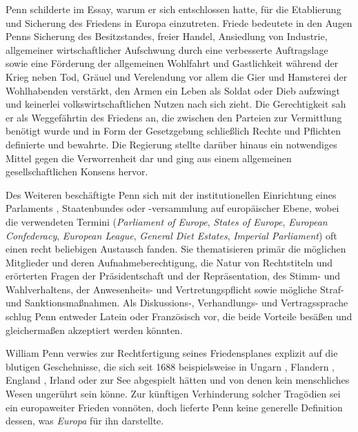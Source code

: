 Penn schilderte im Essay, warum er sich entschlossen hatte, für die
Etablierung und Sicherung des Friedens  in Europa  einzutreten. Friede bedeutete
in den Augen Penns Sicherung des Besitzstandes, freier Handel, Ansiedlung von
Industrie, allgemeiner wirtschaftlicher Aufschwung durch eine verbesserte
Auftragslage sowie eine Förderung der allgemeinen Wohlfahrt  und Gastlichkeit
während der Krieg  neben Tod, Gräuel und Verelendung vor allem die Gier  und
Hamsterei der Wohlhabenden verstärkt, den Armen  ein Leben als Soldat  oder Dieb 
aufzwingt und keinerlei volkswirtschaftlichen  Nutzen nach sich zieht. Die
Gerechtigkeit  sah er als Weggefährtin des Friedens an, die zwischen den Parteien
zur Vermittlung benötigt wurde und in Form der Gesetzgebung  schließlich Rechte
und Pflichten definierte und bewahrte. Die Regierung  stellte darüber hinaus ein
notwendiges Mittel gegen die Verworrenheit dar und ging aus einem allgemeinen
gesellschaftlichen Konsens hervor.

\medskip

Des Weiteren beschäftigte Penn sich mit der institutionellen Einrichtung eines
Parlaments , Staatenbundes  oder -versammlung auf europäischer Ebene, wobei die
verwendeten Termini (\textit{Parliament of Europe}, \textit{States of Europe}, \textit{European Confederacy}, \textit{European League}, \textit{General Diet Estates}, \textit{Imperial Parliament})
oft einen recht beliebigen Austausch fanden. Sie thematisieren primär die
möglichen Mitglieder und deren Aufnahmeberechtigung, die Natur von Rechtstiteln
und erörterten Fragen der Präsidentschaft und der Repräsentation, des Stimm- und
Wahlverhaltens, der Anwesenheits- und Vertretungspflicht sowie mögliche Straf-
und Sanktionsmaßnahmen. Als Diskussions-, Verhandlungs- und Vertragssprache
schlug Penn entweder Latein  oder Französisch  vor,
die beide Vorteile besäßen und gleichermaßen akzeptiert werden könnten.

\medskip

William Penn verwies zur Rechtfertigung seines Friedensplanes  explizit auf die
blutigen Geschehnisse, die sich seit 1688 beispielsweise in Ungarn , Flandern ,
England , Irland  oder zur See abgespielt hätten und von denen kein menschliches
Wesen ungerührt sein könne. Zur künftigen Verhinderung solcher Tragödien sei ein
europaweiter Frieden vonnöten, doch lieferte Penn keine generelle Definition
dessen, was \textit{Europa} für ihn darstellte.

